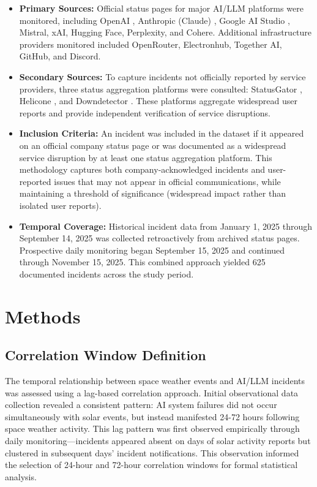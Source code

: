 \documentclass[11pt,a4paper]{article}
\begin{document}
\begin{itemize}
\item \textbf{Primary Sources:} Official status pages for major AI/LLM platforms were monitored, including OpenAI \cite{openai_status}, Anthropic (Claude) \cite{anthropic_status}, Google AI Studio \cite{google_status}, Mistral, xAI, Hugging Face, Perplexity, and Cohere. Additional infrastructure providers monitored included OpenRouter, Electronhub, Together AI, GitHub, and Discord.
\item \textbf{Secondary Sources:} To capture incidents not officially reported by service providers, three status aggregation platforms were consulted: StatusGator \cite{statusgator}, Helicone \cite{helicone}, and Downdetector \cite{downdetector}. These platforms aggregate widespread user reports and provide independent verification of service disruptions.
\item \textbf{Inclusion Criteria:} An incident was included in the dataset if it appeared on an official company status page or was documented as a widespread service disruption by at least one status aggregation platform. This methodology captures both company-acknowledged incidents and user-reported issues that may not appear in official communications, while maintaining a threshold of significance (widespread impact rather than isolated user reports).
\item \textbf{Temporal Coverage:} Historical incident data from January 1, 2025 through September 14, 2025 was collected retroactively from archived status pages. Prospective daily monitoring began September 15, 2025 and continued through November 15, 2025. This combined approach yielded 625 documented incidents across the study period.
\end{itemize}

\section{Methods}

\subsection{Correlation Window Definition}
The temporal relationship between space weather events and AI/LLM incidents was assessed using a lag-based correlation approach. Initial observational data collection revealed a consistent pattern: AI system failures did not occur simultaneously with solar events, but instead manifested 24-72 hours following space weather activity. This lag pattern was first observed empirically through daily monitoring---incidents appeared absent on days of solar activity reports but clustered in subsequent days' incident notifications. This observation informed the selection of 24-hour and 72-hour correlation windows for formal statistical analysis.
\end{document}
